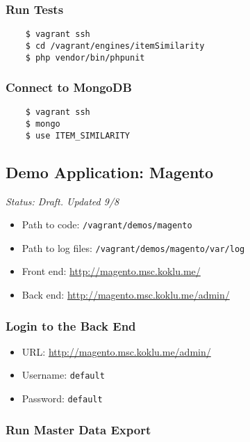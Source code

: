 \subsubsection{Run Tests}

\begin{verbatim}
    $ vagrant ssh
    $ cd /vagrant/engines/itemSimilarity
    $ php vendor/bin/phpunit
\end{verbatim}

\subsubsection{Connect to MongoDB}

\begin{verbatim}
    $ vagrant ssh
    $ mongo
    $ use ITEM_SIMILARITY
\end{verbatim}



\subsection{Demo Application: Magento}

\emph{Status: Draft. Updated 9/8}

\begin{itemize}
\item Path to code: \texttt{/vagrant/demos/magento}
\item Path to log files: \texttt{/vagrant/demos/magento/var/log}
\item Front end: \url{http://magento.msc.koklu.me/}
\item Back end: \url{http://magento.msc.koklu.me/admin/}
\end{itemize}

\subsubsection{Login to the Back End}

\begin{itemize}
\item URL: \url{http://magento.msc.koklu.me/admin/}
\item Username: \texttt{default}
\item Password: \texttt{default}
\end{itemize}

\subsubsection{Run Master Data Export}

